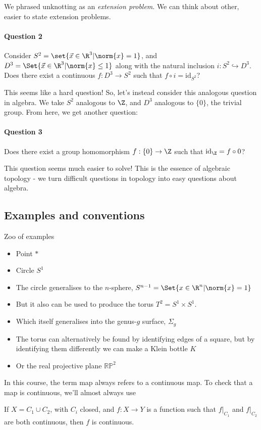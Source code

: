 \documentclass{article}
\newcommand{\id}{\mathrm{id}}
\numberwithin{nthm}{subsection}
\begin{document}
We phrased unknotting as an \emph{extension problem}.  We can think about other, easier to state extension problems.
\paragraph{Question 2}
Consider $S^2 = \set{\vec{x} \in \R^3 | \norm{x} = 1}$, and $D^3 = \Set{\vec{x} \in \R^3 | \norm{x} \leq 1}$ along with the natural inclusion $i: S^2 \hookrightarrow D^3$.
Does there exist a continuous $f: D^3 \to S^2$ such that $f \circ i = \id_{S^2}$?

This seems like a hard question!  So, let's instead consider this analogous question in algebra.
We take $S^2$ analogous to $\Z$, and $D^3$ analogous to $\{0\}$, the trivial group. From here, we get another question:
\paragraph{Question 3} Does there exist a group homomorphism $f: \{0\} \to \Z$ such that $\id_\Z = f \circ 0$?

This question seems much easier to solve! This is the essence of algebraic topology - we turn difficult questions in topology into easy questions about algebra.

\subsection{Examples and conventions}
Zoo of examples

\begin{itemize}
    \item Point $*$
    \item Circle $S^1$
    \item The circle generalises to the $n$-sphere, $S^{n-1} = \Set{x \in \R^n | \norm{x} = 1}$
    \item But it also can be used to produce the torus $T^2 = S^1 \times S^1$.
    \item Which itself generalises into the genus-$g$ surface, $\Sigma_g$
    \item The torus can alternatively be found by identifying edges of a square, but by identifying them differently we can make a Klein bottle $K$
    \item Or the real projective plane $\mathbb{RP}^2$
\end{itemize}

In this course, the term map always refers to a continuous map.
To check that a map is continuous, we'll almost always use
\begin{lemma}
    If $X = C_1 \cup C_2$, with $C_i$ closed, and $f: X \to Y$ is a function such that $f|_{C_1}$ and $f|_{C_2}$ are both continuous, then $f$ is continuous.
\end{lemma}
\end{document}
